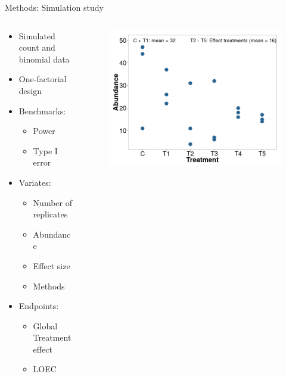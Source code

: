 \documentclass[final,t]{beamer}
\begin{document}
\begin{frame}{}
\begin{columns}[t]
\begin{column}{.48\linewidth}
    \begin{block}{Methods: Simulation study}
    \begin{columns}[T]
    \begin{column}{.48\linewidth}
        \begin{itemize}
            \item Simulated count and binomial data
            \item One-factorial design
            \item Benchmarks:
                \begin{itemize}
                    \item  Power
                    \item Type I error
                \end{itemize}
            \item Variates:
                \begin{itemize}
                    \item Number of replicates
                    \item Abundance
                    \item Effect size
                    \item Methods 
                \end{itemize}
            \item Endpoints:
                \begin{itemize}
                    \item Global Treatment effect
                    \item LOEC
                \end{itemize}
            \end{itemize}
        \end{column}
        \begin{column}{.48\linewidth}
            \begin{figure}
             \includegraphics[width=.9\linewidth]{fig/sim.png}

\end{figure}
\end{column}
\end{columns}
\end{block}
\end{column}
\end{columns}
\end{frame}
\end{document}
